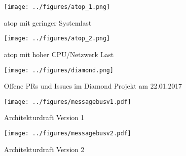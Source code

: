\begin{figure}[tbph]
  \centering
  \texttt{[image: ../figures/atop\_1.png]}
  \caption{atop mit geringer Systemlast}
\label{figure:atop1}
\end{figure}

\begin{figure}[tbp]
  \centering
  \texttt{[image: ../figures/atop\_2.png]}
  \caption{atop mit hoher CPU/Netzwerk Last}
\label{figure:atop2}
\end{figure}

\begin{figure}[tbp]
  \centering
  \texttt{[image: ../figures/diamond.png]}
  \caption{Offene PRs und Issues im Diamond Projekt am 22.01.2017}
\label{figure:diamond}
\end{figure}

\begin{figure}[tbp]
  \centering
  \texttt{[image: ../figures/messagebusv1.pdf]}
  \caption{Architekturdraft Version 1}
\label{figure:draft1}
\end{figure}
\begin{figure}[tbp]
  \centering
  \texttt{[image: ../figures/messagebusv2.pdf]}
  \caption{Architekturdraft Version 2}
\label{figure:draft2}
\end{figure}
\FloatBarrier{}
